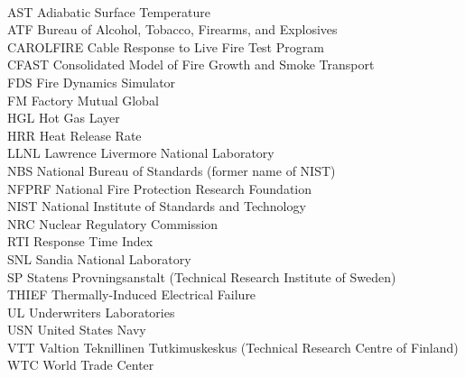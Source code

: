 \documentclass[11pt]{book}
\begin{document}
\begin{tabbing}
\hspace{1.5in} \= \\
AST \> Adiabatic Surface Temperature \\
ATF \> Bureau of Alcohol, Tobacco, Firearms, and Explosives \\
CAROLFIRE \> Cable Response to Live Fire Test Program \\
CFAST \> Consolidated Model of Fire Growth and Smoke Transport \\
FDS \> Fire Dynamics Simulator \\
FM \> Factory Mutual Global \\
HGL \> Hot Gas Layer \\
HRR \> Heat Release Rate \\
LLNL \> Lawrence Livermore National Laboratory \\
NBS \> National Bureau of Standards (former name of NIST) \\
NFPRF \> National Fire Protection Research Foundation \\
NIST \> National Institute of Standards and Technology \\
NRC \> Nuclear Regulatory Commission \\
RTI \> Response Time Index \\
SNL \> Sandia National Laboratory \\
SP \>  Statens Provningsanstalt (Technical Research Institute of Sweden) \\
THIEF \> Thermally-Induced Electrical Failure \\
UL  \> Underwriters Laboratories \\
USN \> United States Navy \\
VTT \> Valtion Teknillinen Tutkimuskeskus (Technical Research Centre of Finland) \\
WTC \> World Trade Center \\
\end{tabbing}

\mainmatter























\appendix


\end{document}
